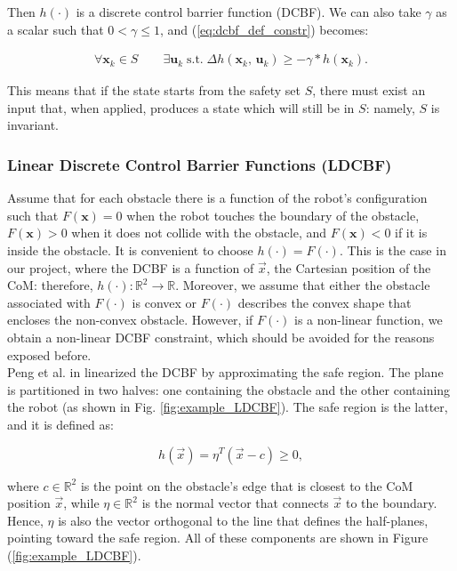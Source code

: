 Then $h(\cdot)$ is a discrete control barrier function (DCBF). We can also take $\gamma$ as a scalar such that $0 < \gamma \leq 1$, and (\ref{eq:dcbf_def_constr}) becomes:

\begin{gather*}
    \forall \mathbf{x}_k \in S \qquad \exists \mathbf{u}_k \; \text{s.t.} \; \Delta h(\mathbf{x}_k,\, \mathbf{u}_k) \geq -\gamma * h(\mathbf{x}_k). 
\end{gather*}

This means that if the state starts from the safety set $S$, there must exist an input that, when applied, produces a state which will still be in $S$: namely, $S$ is invariant.

\subsubsection{Linear Discrete Control Barrier Functions (LDCBF)}\label{subsec:ldcbf}
Assume that for each obstacle there is a function of the robot's configuration such that $F(\mathbf{x})=0$ when the robot touches the boundary of the obstacle, $F(\mathbf{x})>0$ when it does not collide with the obstacle, and $F(\mathbf{x})<0$ if it is inside the obstacle. It is convenient to choose $h(\cdot)=F(\cdot)$. This is the case in our project, where the DCBF is a function of $\vec{x}$, the Cartesian position of the CoM: therefore, $h(\cdot)\colon \mathbb{R}^2 \rightarrow \mathbb{R}$. Moreover, we assume that either the obstacle associated with $F(\cdot)$ is convex or $F(\cdot)$ describes the convex shape that encloses the non-convex obstacle.
However, if $F(\cdot)$ is a non-linear function, we obtain a non-linear DCBF constraint, which should be avoided for the reasons exposed before.\\
Peng et al. in \cite{peng_main_paper} linearized the DCBF by approximating the safe region. The plane is partitioned in two halves: one containing the obstacle and the other containing the robot (as shown in Fig. \ref{fig:example_LDCBF}).
The safe region is the latter, and it is defined as:

\begin{equation} \label{eq:std_ldcbf_def}
h\left(\vec{x}\right) = \eta^T \left(\vec{x} - c\right) \geq 0,
\end{equation}

where $c \in \mathbb{R}^2$ is the point on the obstacle's edge that is closest to the CoM position $\vec{x}$, while $\eta \in \mathbb{R}^2$ is the normal vector that connects $\vec{x}$ to the boundary. Hence, $\eta$ is also the vector orthogonal to the line that defines the half-planes, pointing toward the safe region. All of these components are shown in Figure (\ref{fig:example_LDCBF}).\\

